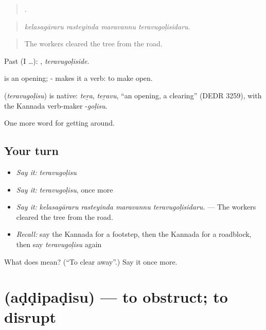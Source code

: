 \begin{quote}
   .
\end{quote}

\begin{quote}
\emph{kelasagāraru rasteyinda maravannu teravugoḷisidaru.}
\end{quote}

\begin{quote}
The workers cleared the tree from the road.
\end{quote}

Past (I …): , \emph{teravugoḷiside}.

 is an opening; - makes it a verb: to make open.

\begin{cousinweb}
\textbf{} (\emph{teravugoḷisu}) is native: \emph{teṟa}, \emph{teṟavu}, \textquotedblleft{}an opening, a clearing\textquotedblright{} (DEDR 3259), with the Kannada verb-maker -\emph{goḷisu}.
\end{cousinweb}

\begin{grammarlens}[title={What you've built}]
One more word for getting around.
\end{grammarlens}

\subsection*{Your turn}
\begin{itemize}
\raggedright
  \item \emph{Say it:} \emph{teravugoḷisu}
  \item \emph{Say it:} \emph{teravugoḷisu}, once more
  \item \emph{Say it:} \emph{kelasagāraru rasteyinda maravannu teravugoḷisidaru.} — The workers cleared the tree from the road.
  \item \emph{Recall:} say the Kannada for a footstep, then the Kannada for a roadblock, then say \emph{teravugoḷisu} again
\end{itemize}

\begin{tcolorbox}[breakable,colback=teal!4,colframe=teal!35!black,title={Before you move on}]
What does  mean? (\textquotedblleft{}To clear away\textquotedblright{}.) Say it once more.
\end{tcolorbox}
\section[\texorpdfstring{\kn{ಅಡ್ಡಿಪಡಿಸು} (aḍḍipaḍisu)}{ಅಡ್ಡಿಪಡಿಸು (aḍḍipaḍisu)}]{ (aḍḍipaḍisu) — to obstruct; to disrupt}

